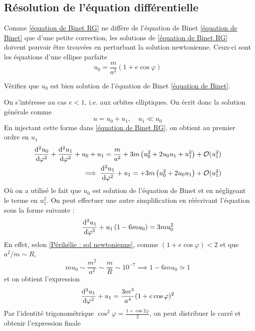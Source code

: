 \subsection{Résolution de l'équation différentielle}
Comme \ref{équation de Binet RG} ne diffère de l'équation de Binet \ref{équation de Binet} que d'une petite correction, les solutions de \ref{équation de Binet RG} doivent pouvoir être trouvées en perturbant la solution newtonienne. Ceux-ci sont les équations d'une ellipse parfaite
\begin{equation}
    \label{Périhélie : sol newtonienne}
    u_0 = \frac{m}{a^2} (1 +e \cos\varphi)
\end{equation}
\begin{exerc}
    Vérifiez que $u_0$ est bien solution de l'équation de Binet \ref{équation de Binet}.
\end{exerc}
On s'intéresse au cas $e<1$, i.e. aux orbites elliptiques. On écrit donc la solution générale comme
\begin{equation}
    u = u_0 +u_1, \quad u_1 \ll u_0
\end{equation}
En injectant cette forme dans \ref{équation de Binet RG}, on obtient au premier ordre en $u_1$
\begin{align}
    \frac{\mathrm{d}^2 u_0}{\mathrm{d} \varphi^2} +\frac{\mathrm{d}^2 u_1}{\mathrm{d} \varphi^2} + u_0 + u_1 = \frac{m}{a^2} + 3m \left( u_0^2 + 2u_0u_1 +u_1^2 \right) + \mathcal{O}(u_1^2) \\
    \implies \frac{\mathrm{d}^2 u_1}{\mathrm{d} \varphi^2} + u_1 = + 3m \left( u_0^2 +2u_0u_1 \right) + \mathcal{O}(u_1^2)
\end{align}
Où on a utilisé le fait que $u_0$ est solution de l'équation de Binet et en négligeant le terme en $u_1^2$. On peut effectuer une autre simplification en réécrivant l'équation sous la forme suivante :
\begin{equation}
    \frac{\mathrm{d}^2 u_1}{\mathrm{d} \varphi^2} + u_1 \left( 1 - 6m u_0 \right) = 3m  u_0^2
\end{equation}
En effet, selon \ref{Périhélie : sol newtonienne}, comme $(1+ e\cos \varphi) < 2$ et que $a^2/m \sim R$, 
\begin{equation}
    m u_0 \sim \frac{m^2}{a^2} \sim \frac{m}{R} \sim 10^{-7} \implies 1- 6mu_0 \simeq 1
\end{equation}
et on obtient l'expression
\begin{equation}
    \frac{\mathrm{d}^2 u_1}{\mathrm{d} \varphi^2} + u_1  = \frac{3m^3}{a^4} (1 +e \cos\varphi)^2
\end{equation}
Par l'identité trigonométrique $\cos^2\varphi = \frac{1 + \cos 2\varphi}{2}$, on peut distribuer le carré et obtenir l'expression finale
